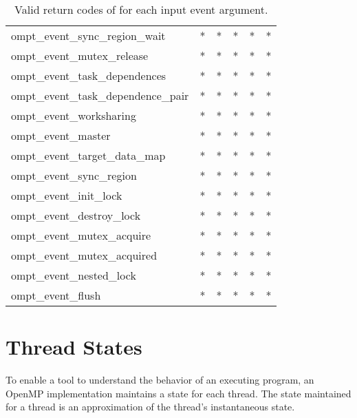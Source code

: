 \begin{table}
\begin{tabular}{lp{3em}p{3em}p{3em}p{3em}p{3em}}
ompt\_event\_sync\_region\_wait     & * & * & * & * & * \\
ompt\_event\_mutex\_release         & * & * & * & * & * \\
ompt\_event\_task\_dependences      & * & * & * & * & * \\
ompt\_event\_task\_dependence\_pair & * & * & * & * & * \\
ompt\_event\_worksharing            & * & * & * & * & * \\
ompt\_event\_master                 & * & * & * & * & * \\
ompt\_event\_target\_data\_map      & * & * & * & * & * \\
ompt\_event\_sync\_region           & * & * & * & * & * \\
ompt\_event\_init\_lock             & * & * & * & * & * \\
ompt\_event\_destroy\_lock          & * & * & * & * & * \\
ompt\_event\_mutex\_acquire         & * & * & * & * & * \\
ompt\_event\_mutex\_acquired        & * & * & * & * & * \\
ompt\_event\_nested\_lock           & * & * & * & * & * \\
ompt\_event\_flush                  & * & * & * & * & * \\
\bottomrule
\end{tabular}
\caption{Valid return codes of  for each input event argument.}
\label{table:valid_rc}
\end{table}

\clearpage
\section{Thread States}
\label{sec:runtimeStates}

To enable a tool to understand the behavior of an executing program, 
an OpenMP implementation maintains a state for each thread. 
The state maintained for a thread is an
approximation of the thread's instantaneous state. 


